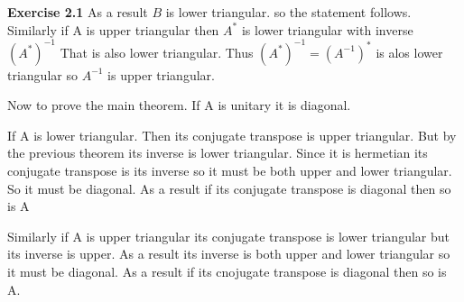\documentclass[12pt]{article}
\newenvironment{exercise}[1]{\vspace{.1in}\noindent\textbf{Exercise #1 \hspace{.05em}}}{}
\begin{document}
\begin{exercise}{2.1}
	As a result $B$ is lower triangular. so the statement follows. Similarly if A is upper triangular then $A^*$ is lower triangular with inverse $(A^{*})^{-1}$ That is also lower triangular. Thus $(A^{*})^{-1}=(A^{-1})^{*}$ is alos lower triangular so $A^{-1}$ is upper triangular.

	Now to prove the main theorem. If A is unitary it is diagonal.

	If A is lower triangular. Then its conjugate transpose is upper triangular. But by the previous theorem its inverse is lower triangular. Since it is hermetian its conjugate transpose is its inverse so it must be both upper and lower triangular. So it must be diagonal. As a result if its conjugate transpose is diagonal then so is A

	Similarly if A is upper triangular its conjugate transpose is lower triangular but its inverse is upper. As a result its inverse is both upper and lower triangular so it must be diagonal. As a result if its cnojugate transpose is diagonal then so is A.
\end{exercise}
\end{document}
